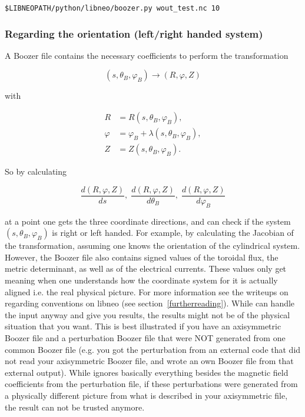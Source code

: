 \documentclass{article}
\newcommand{\vv}[1]{\texttt{\detokenize{#1}}}
\begin{document}
\begin{verbatim}
$LIBNEOPATH/python/libneo/boozer.py wout_test.nc 10
\end{verbatim}

\subsubsection{Regarding the orientation (left/right handed system)}
A Boozer file contains the necessary coefficients to perform the transformation 

\begin{equation*}
    (s,\theta_B,\varphi_B) \to (R,\varphi,Z)
\end{equation*}

with

\begin{align*}
    R &= R(s, \theta_B, \varphi_B), \\
    \varphi &= \varphi_B + \lambda(s, \theta_B, \varphi_B), \\
    Z &= Z(s, \theta_B, \varphi_B).
\end{align*}

So by calculating

\begin{equation*}
	\frac{d(R,\varphi,Z)}{ds},\; \frac{d(R,\varphi,Z)}{d\theta_B},\; \frac{d(R,\varphi,Z)}{d\varphi_B}
\end{equation*}

at a point one gets the three coordinate directions, and can check if the 
system $(s,\theta_B,\varphi_B)$ is right or left handed. For example, by calculating
the Jacobian of the transformation, assuming one knows the orientation of the cylindrical system. 
However, the Boozer file also contains signed values of the toroidal flux, 
the metric determinant, as well as of the electrical currents. These values 
only get meaning when one understands how the coordinate system for it is 
actually aligned i.e. the real physical picture. For more information see the 
writeups on regarding conventions on libneo (see section~\ref{furtherreading}). 
While \vv{NEO-2} can handle the input anyway and give you 
results, the results might not be of the physical situation that you want. 
This is best illustrated if you have an axisymmetric Boozer file and a 
perturbation Boozer file that were NOT generated from one common Boozer 
file (e.g. you got the perturbation from an external code that did not 
read your axisymmetric Boozer file, and wrote an own Boozer file from 
that external output). While \vv{NEO-2} ignores basically everything besides 
the magnetic field coefficients from the perturbation file, if these 
perturbations were generated from a physically different picture from
what is described in your axisymmetric file, the result can not be trusted anymore.
\end{document}
